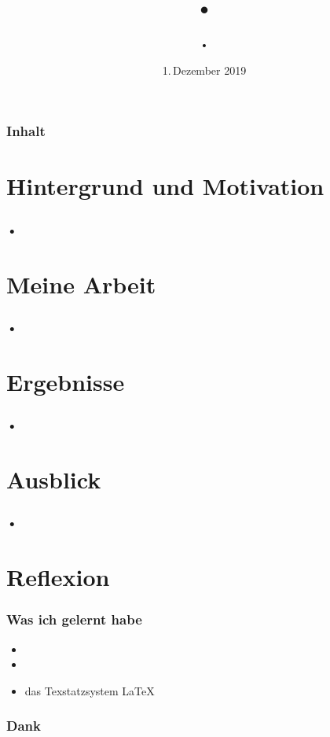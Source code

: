 \documentclass[11pt,german,aspectratio=169]{beamer}
\title{•\\
}
\author{•}
\date{1.\,Dezember 2019}
\begin{document}
\frame{\titlepage}   %

\begin{frame}
\frametitle{Inhalt}  %
\tableofcontents
\end{frame}

\section{Hintergrund und Motivation} %
\frame
{
	\frametitle{•}
}

\section{Meine Arbeit}
\frame
{
	\frametitle{•}
}

\section{Ergebnisse}
\frame
{
	\frametitle{•}
}

\section{Ausblick}
\frame
{
	\frametitle{•}
}

\section{Reflexion}
\frame
{
	\frametitle{Was ich gelernt habe}
	\begin{itemize}
		\item 
		\item 
		\item das Texstatzsystem \LaTeX
	\end{itemize}
}

\frame
{
	\frametitle{Dank}
}
\end{document}
